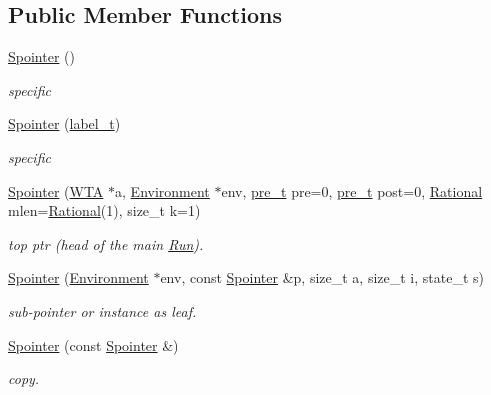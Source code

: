 \subsection*{Public Member Functions}
\begin{DoxyCompactItemize}
\item 
\mbox{\hyperlink{group__table_ga467ee6f93cd0429edb40fc4de100c3c4}{Spointer}} ()
\begin{DoxyCompactList}\small\item\em specific \end{DoxyCompactList}\item 
\mbox{\hyperlink{group__table_gaad8a647a58df31aefd8f2703b9f86dc5}{Spointer}} (\mbox{\hyperlink{group__output_ga22fde970e635fcf63962743b2d5c441d}{label\+\_\+t}})
\begin{DoxyCompactList}\small\item\em specific \end{DoxyCompactList}\item 
\mbox{\hyperlink{group__table_ga49f82b7aafd3ae237243c85272597fa7}{Spointer}} (\mbox{\hyperlink{classWTA}{W\+TA}} $\ast$a, \mbox{\hyperlink{classEnvironment}{Environment}} $\ast$env, \mbox{\hyperlink{group__general_ga092fe8b972dfa977c2a0886720a7731e}{pre\+\_\+t}} pre=0, \mbox{\hyperlink{group__general_ga092fe8b972dfa977c2a0886720a7731e}{pre\+\_\+t}} post=0, \mbox{\hyperlink{classRational}{Rational}} mlen=\mbox{\hyperlink{classRational}{Rational}}(1), size\+\_\+t k=1)
\begin{DoxyCompactList}\small\item\em top ptr (head of the main \mbox{\hyperlink{classRun}{Run}}). \end{DoxyCompactList}\item 
\mbox{\hyperlink{group__table_ga72441f0d67497c90602a123c45dc53d1}{Spointer}} (\mbox{\hyperlink{classEnvironment}{Environment}} $\ast$env, const \mbox{\hyperlink{classSpointer}{Spointer}} \&p, size\+\_\+t a, size\+\_\+t i, state\+\_\+t s)
\begin{DoxyCompactList}\small\item\em sub-\/pointer or instance as leaf. \end{DoxyCompactList}\item 
\mbox{\hyperlink{group__table_gaf40e1a1f0edc608d4413f096a19aae78}{Spointer}} (const \mbox{\hyperlink{classSpointer}{Spointer}} \&)
\begin{DoxyCompactList}\small\item\em copy. \end{DoxyCompactList}\item 

\end{DoxyCompactItemize}
